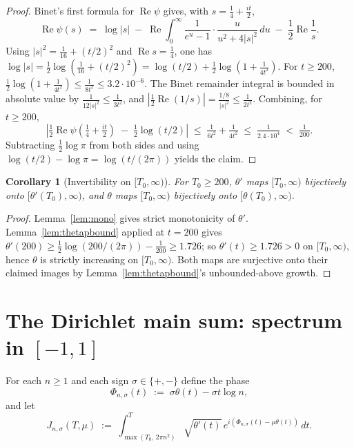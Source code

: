 \documentclass[11pt]{article}
\newtheorem{corollary}{Corollary}
\DeclareMathOperator{\ReOp}{Re}
\let\Re\ReOp
\begin{document}
\begin{proof}
Binet's first formula for $\Re\psi$ gives, with $s = \tfrac14+\tfrac{it}{2}$,
\[
  \Re\psi(s) \;=\; \log|s| \;-\; \Re\!\int_{0}^{\infty}\!\frac{1}{e^{u}-1}\cdot\frac{u}{u^{2}+4|s|^{2}}\,du \;-\; \frac{1}{2}\Re\frac{1}{s}.
\]
Using $|s|^{2} = \tfrac{1}{16}+(t/2)^{2}$ and $\Re s = \tfrac14$, one has $\log|s| = \tfrac12\log(\tfrac{1}{16}+(t/2)^{2}) = \log(t/2) + \tfrac12\log(1+\tfrac{1}{4t^{2}})$. For $t\ge 200$, $\tfrac12\log(1+\tfrac{1}{4t^{2}}) \le \tfrac{1}{8t^{2}} \le 3.2\cdot 10^{-6}$. The Binet remainder integral is bounded in absolute value by $\tfrac{1}{12|s|^{2}}\le \tfrac{1}{3t^{2}}$, and $|\tfrac12\Re(1/s)| = \tfrac{1/8}{|s|^{2}}\le \tfrac{1}{2t^{2}}$. Combining, for $t\ge 200$,
\[
  \left|\tfrac12\Re\psi(\tfrac14+\tfrac{it}{2}) \;-\; \tfrac12\log(t/2)\right|\;\le\; \tfrac{1}{6t^{2}} + \tfrac{1}{4t^{2}} \;\le\; \tfrac{1}{2.4\cdot 10^{4}} \;<\; \tfrac{1}{200}.
\]
Subtracting $\tfrac12\log\pi$ from both sides and using $\log(t/2) - \log\pi = \log(t/(2\pi))$ yields the claim.
\end{proof}

\begin{corollary}[Invertibility on $[T_{0},\infty)$]\label{cor:inv}
For $T_{0}\ge 200$, $\theta'$ maps $[T_{0},\infty)$ bijectively onto $[\theta'(T_{0}),\infty)$, and $\theta$ maps $[T_{0},\infty)$ bijectively onto $[\theta(T_{0}),\infty)$.
\end{corollary}

\begin{proof}
Lemma~\ref{lem:mono} gives strict monotonicity of $\theta'$. Lemma~\ref{lem:thetapbound} applied at $t = 200$ gives $\theta'(200)\ge \tfrac12\log(200/(2\pi)) - \tfrac{1}{200} \ge 1.726$; so $\theta'(t)\ge 1.726 > 0$ on $[T_{0},\infty)$, hence $\theta$ is strictly increasing on $[T_{0},\infty)$. Both maps are surjective onto their claimed images by Lemma~\ref{lem:thetapbound}'s unbounded-above growth.
\end{proof}

\section{The Dirichlet main sum: spectrum in $[-1,1]$}

For each $n\ge 1$ and each sign $\sigma\in\{+,-\}$ define the phase
\[
  \Phi_{n,\sigma}(t) \;:=\; \sigma\theta(t) - \sigma t\log n,
\]
and let
\[
  J_{n,\sigma}(T,\mu) \;:=\; \int_{\max(T_{0},\,2\pi n^{2})}^{T} \sqrt{\theta'(t)}\,e^{i(\Phi_{n,\sigma}(t) - \mu\theta(t))}\,dt.
\]
\end{document}
